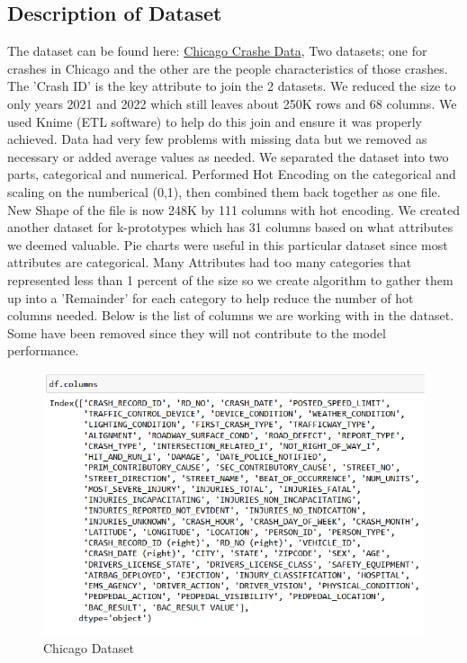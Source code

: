 \documentclass[conference]{IEEEtran}
\begin{document}
\subsection{Description of Dataset}
The dataset can be found here: \href{https://data.cityofchicago.org/Transportation/Traffic-Crashes-Crashes/85ca-t3if}{Chicago Crashe Data}, Two datasets; one for crashes in Chicago and the other are the people characteristics of those crashes.  The 'Crash ID' is the key attribute to join the 2 datasets.  We reduced the size to only years 2021 and 2022 which still leaves about 250K rows and 68 columns.  We used Knime (ETL software) to help do this join and ensure it was properly achieved.  Data had very few problems with missing data but we removed as necessary or added average values as needed. We separated the dataset into two parts, categorical and numerical.  Performed Hot Encoding
on the categorical and scaling on the numberical (0,1), then combined them back together as one file.  New Shape of the file is now  248K by 111 columns with hot encoding. We created another dataset for k-prototypes which has 31 columns based on what attributes we deemed valuable.  Pie charts were useful in this particular dataset since most attributes are categorical.  Many Attributes had too many categories that represented less than 1 percent of the size so we create algorithm to gather them up into a 'Remainder' for each category to help reduce the number of hot columns needed. \linebreak
Below is the list of columns we are working with in the dataset.  Some have been removed since they will not contribute to the model performance.
\begin{figure}[!h]
	\includegraphics[width=\linewidth]{Chicago_Column.png}
	\caption{Chicago Dataset}
	\label{fig: Chicago Dataset for Crashes and People involved}
 \end{figure}
\end{document}
